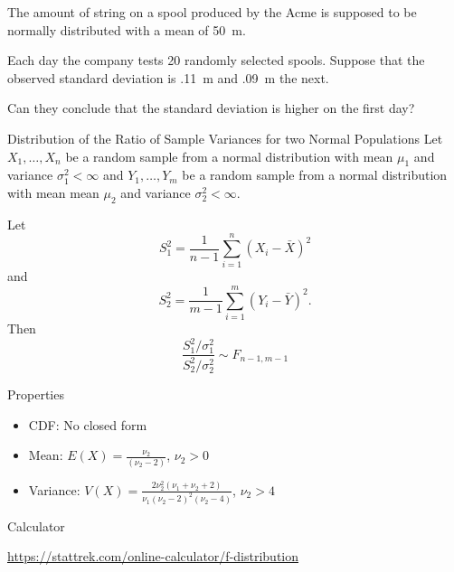 \begin{frame}

  \begin{block}{\example}
  The amount of string on a spool produced by the Acme is supposed to be normally distributed with a mean of 50~m. 
  
  \medskip
  
  Each day the company tests 20 randomly selected spools. Suppose that the observed standard deviation is .11~m and .09~m the next.
  
  \medskip
  
  Can they conclude that the standard deviation is higher on the first day?
  \end{block}
\end{frame}

\begin{frame}

  \begin{block}{Distribution of the Ratio of Sample Variances for two Normal Populations}
    Let $X_1,\ldots,X_n$ be a random sample from a normal distribution with mean $\mu_1$ and variance $\sigma_1^2 < \infty$ and $Y_1,\ldots,Y_m$ be a random sample from a normal distribution with mean mean $\mu_2$ and variance $\sigma_2^2 < \infty$.
    
    \medskip
    
    Let 
    $$
    S^2_1=\frac{1}{n-1}\sum_{i=1}^n(X_i -\bar X)^2
    $$
    and
    $$
     S^2_2=\frac{1}{m-1}\sum_{i=1}^m(Y_i -\bar Y)^2.
    $$
    Then
    $$
    \frac{S_1^2/\sigma_1^2}{S_2^2/\sigma_2^2} \sim F_{n-1,m-1}
    $$ 
  \end{block}

\end{frame}

\begin{frame}

  \begin{block}{Properties}
        \begin{itemize}
        \item CDF: No closed form
        \item Mean: $E(X)=\frac{\nu_2}{(\nu_2-2)}$, $\nu_2>0$
        \item Variance: $V(X)=\frac{2\nu_2^2(\nu_1+ \nu_2 + 2)}{\nu_1(\nu_2-2)^2(\nu_2-4)}$, $\nu_2>4$
        \end{itemize}
  \end{block}

    \begin{block}{Calculator}

    \begin{center}
    \url{https://stattrek.com/online-calculator/f-distribution}
    \end{center}
    \end{block}
\end{frame}

